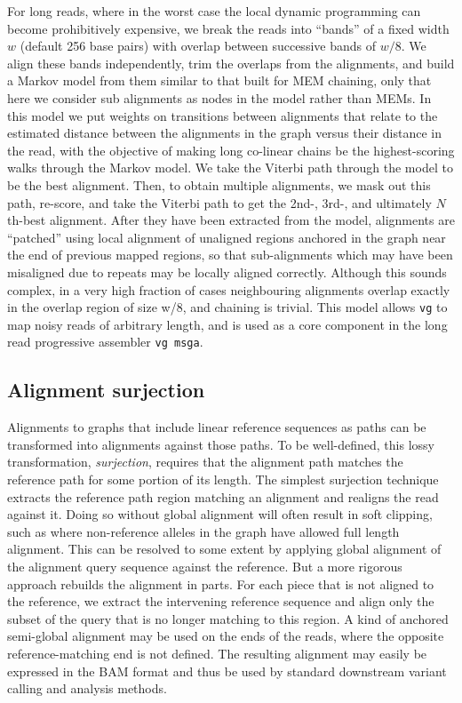 For long reads, where in the worst case the local dynamic programming can become prohibitively expensive, we break the reads into ``bands'' of a fixed width $w$ (default 256 base pairs) with overlap between successive bands of $w/8$.
We align these bands independently, trim the overlaps from the alignments, and build a Markov model from them similar to that built for MEM chaining, only that here we consider sub alignments as nodes in the model rather than MEMs.
In this model we put weights on transitions between alignments that relate to the estimated distance between the alignments in the graph versus their distance in the read, with the objective of making long co-linear chains be the highest-scoring walks through the Markov model.
We take the Viterbi path through the model to be the best alignment.
Then, to obtain multiple alignments, we mask out this path, re-score, and take the Viterbi path to get the 2nd-, 3rd-, and ultimately $N$th-best alignment.
After they have been extracted from the model, alignments are ``patched'' using local alignment of unaligned regions anchored in the graph near the end of previous mapped regions, so that sub-alignments which may have been misaligned due to repeats may be locally aligned correctly.
Although this sounds complex, in a very high fraction of cases neighbouring alignments overlap exactly in the overlap region of size w/8, and chaining is trivial.
This model allows {\tt vg} to map noisy reads of arbitrary length, and is used as a core component in the long read progressive assembler {\tt vg msga}.


\subsection{Alignment surjection}

Alignments to graphs that include linear reference sequences as paths can be transformed into alignments against those paths.
To be well-defined, this lossy transformation, \emph{surjection}, requires that the alignment path matches the reference path for some portion of its length.
The simplest surjection technique extracts the reference path region matching an alignment and realigns the read against it.
Doing so without global alignment will often result in soft clipping, such as where non-reference alleles in the graph have allowed full length alignment.
This can be resolved to some extent by applying global alignment of the alignment query sequence against the reference.
But a more rigorous approach rebuilds the alignment in parts.
For each piece that is not aligned to the reference, we extract the intervening reference sequence and align only the subset of the query that is no longer matching to this region.
A kind of anchored semi-global alignment may be used on the ends of the reads, where the opposite reference-matching end is not defined.
The resulting alignment may easily be expressed in the BAM format and thus be used by standard downstream variant calling and analysis methods.


